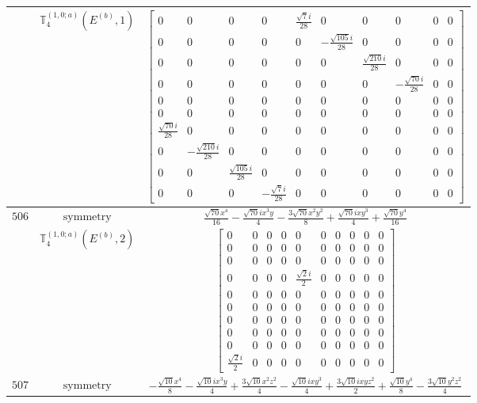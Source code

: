 \documentclass[fleqn,8pt,landscape]{jsarticle}
\begin{document}
\begin{longtable}{ccc}
$  $ & $ \mathbb{T}_{4}^{(1,0;a)}(E^{(b)},1) $ & $ \begin{bmatrix} 0 & 0 & 0 & 0 & \frac{\sqrt{7} i}{28} & 0 & 0 & 0 & 0 & 0 \\ 0 & 0 & 0 & 0 & 0 & - \frac{\sqrt{105} i}{28} & 0 & 0 & 0 & 0 \\ 0 & 0 & 0 & 0 & 0 & 0 & \frac{\sqrt{210} i}{28} & 0 & 0 & 0 \\ 0 & 0 & 0 & 0 & 0 & 0 & 0 & - \frac{\sqrt{70} i}{28} & 0 & 0 \\ 0 & 0 & 0 & 0 & 0 & 0 & 0 & 0 & 0 & 0 \\ 0 & 0 & 0 & 0 & 0 & 0 & 0 & 0 & 0 & 0 \\ \frac{\sqrt{70} i}{28} & 0 & 0 & 0 & 0 & 0 & 0 & 0 & 0 & 0 \\ 0 & - \frac{\sqrt{210} i}{28} & 0 & 0 & 0 & 0 & 0 & 0 & 0 & 0 \\ 0 & 0 & \frac{\sqrt{105} i}{28} & 0 & 0 & 0 & 0 & 0 & 0 & 0 \\ 0 & 0 & 0 & - \frac{\sqrt{7} i}{28} & 0 & 0 & 0 & 0 & 0 & 0 \end{bmatrix} $ \\ \hline
$ 506 $ & $ \text{symmetry} $ & $ \frac{\sqrt{70} x^{4}}{16} - \frac{\sqrt{70} i x^{3} y}{4} - \frac{3 \sqrt{70} x^{2} y^{2}}{8} + \frac{\sqrt{70} i x y^{3}}{4} + \frac{\sqrt{70} y^{4}}{16} $ \\
$  $ & $ \mathbb{T}_{4}^{(1,0;a)}(E^{(b)},2) $ & $ \begin{bmatrix} 0 & 0 & 0 & 0 & 0 & 0 & 0 & 0 & 0 & 0 \\ 0 & 0 & 0 & 0 & 0 & 0 & 0 & 0 & 0 & 0 \\ 0 & 0 & 0 & 0 & 0 & 0 & 0 & 0 & 0 & 0 \\ 0 & 0 & 0 & 0 & \frac{\sqrt{2} i}{2} & 0 & 0 & 0 & 0 & 0 \\ 0 & 0 & 0 & 0 & 0 & 0 & 0 & 0 & 0 & 0 \\ 0 & 0 & 0 & 0 & 0 & 0 & 0 & 0 & 0 & 0 \\ 0 & 0 & 0 & 0 & 0 & 0 & 0 & 0 & 0 & 0 \\ 0 & 0 & 0 & 0 & 0 & 0 & 0 & 0 & 0 & 0 \\ 0 & 0 & 0 & 0 & 0 & 0 & 0 & 0 & 0 & 0 \\ \frac{\sqrt{2} i}{2} & 0 & 0 & 0 & 0 & 0 & 0 & 0 & 0 & 0 \end{bmatrix} $ \\ \hline
$ 507 $ & $ \text{symmetry} $ & $ - \frac{\sqrt{10} x^{4}}{8} - \frac{\sqrt{10} i x^{3} y}{4} + \frac{3 \sqrt{10} x^{2} z^{2}}{4} - \frac{\sqrt{10} i x y^{3}}{4} + \frac{3 \sqrt{10} i x y z^{2}}{2} + \frac{\sqrt{10} y^{4}}{8} - \frac{3 \sqrt{10} y^{2} z^{2}}{4} $ \\

\end{longtable}
\end{document}
